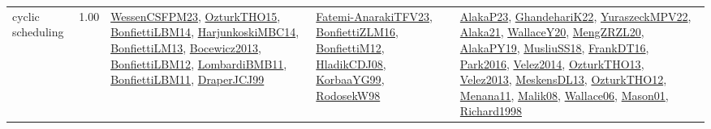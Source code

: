 {\begin{longtable}{p{3cm}r>{\raggedright\arraybackslash}p{6cm}>{\raggedright\arraybackslash}p{6cm}>{\raggedright\arraybackslash}p{8cm}}
\index{cyclic scheduling}\index{Concepts!cyclic scheduling}cyclic scheduling &  1.00 & \hyperref[detail:WessenCSFPM23]{WessenCSFPM23}, \hyperref[detail:OzturkTHO15]{OzturkTHO15}, \hyperref[detail:BonfiettiLBM14]{BonfiettiLBM14}, \hyperref[detail:HarjunkoskiMBC14]{HarjunkoskiMBC14}, \hyperref[detail:BonfiettiLM13]{BonfiettiLM13}, \hyperref[detail:Bocewicz2013]{Bocewicz2013}, \hyperref[detail:BonfiettiLBM12]{BonfiettiLBM12}, \hyperref[detail:LombardiBMB11]{LombardiBMB11}, \hyperref[detail:BonfiettiLBM11]{BonfiettiLBM11}, \hyperref[detail:DraperJCJ99]{DraperJCJ99} & \hyperref[detail:Fatemi-AnarakiTFV23]{Fatemi-AnarakiTFV23}, \hyperref[detail:BonfiettiZLM16]{BonfiettiZLM16}, \hyperref[detail:BonfiettiM12]{BonfiettiM12}, \hyperref[detail:HladikCDJ08]{HladikCDJ08}, \hyperref[detail:KorbaaYG99]{KorbaaYG99}, \hyperref[detail:RodosekW98]{RodosekW98} & \hyperref[detail:AlakaP23]{AlakaP23}, \hyperref[detail:GhandehariK22]{GhandehariK22}, \hyperref[detail:YuraszeckMPV22]{YuraszeckMPV22}, \hyperref[detail:Alaka21]{Alaka21}, \hyperref[detail:WallaceY20]{WallaceY20}, \hyperref[detail:MengZRZL20]{MengZRZL20}, \hyperref[detail:AlakaPY19]{AlakaPY19}, \hyperref[detail:MusliuSS18]{MusliuSS18}, \hyperref[detail:FrankDT16]{FrankDT16}, \hyperref[detail:Park2016]{Park2016}, \hyperref[detail:Velez2014]{Velez2014}, \hyperref[detail:OzturkTHO13]{OzturkTHO13}, \hyperref[detail:Velez2013]{Velez2013}, \hyperref[detail:MeskensDL13]{MeskensDL13}, \hyperref[detail:OzturkTHO12]{OzturkTHO12}, \hyperref[detail:Menana11]{Menana11}, \hyperref[detail:Malik08]{Malik08}, \hyperref[detail:Wallace06]{Wallace06}, \hyperref[detail:Mason01]{Mason01}, \hyperref[detail:Richard1998]{Richard1998}\\

\end{longtable}}
